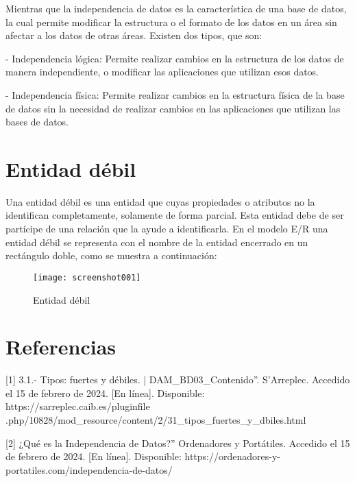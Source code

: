 \documentclass{article}
\begin{document}
	\vspace*{0.5cm}
	
	Mientras que la independencia de datos es la característica de una base de datos, la cual permite modificar la estructura o el formato de los datos en un área sin afectar a los datos de otras áreas. Existen dos tipos, que son:
	
	\vspace*{0.5cm}
	
	- Independencia lógica: Permite realizar cambios en la estructura de los datos de manera independiente, o modificar las aplicaciones que utilizan esos datos.

	- Independencia física: Permite realizar cambios en la estructura física de la base de datos sin la necesidad de realizar cambios en las aplicaciones que utilizan las bases de datos.

	\vspace*{5 cm}

	\section{Entidad débil}
	Una entidad débil es una entidad que cuyas propiedades o atributos no la identifican completamente, solamente de forma parcial. Esta entidad debe de ser partícipe de una relación que la ayude a identificarla.
	En el modelo E/R una entidad débil se representa con el nombre de la entidad encerrado en un rectángulo doble, como se muestra a continuación:

	
\begin{figure}[h]
	\centering
	\texttt{[image: screenshot001]}
	\caption{Entidad débil}
	\label{fig:screenshot001}
\end{figure}

	\section{Referencias}

[1]	3.1.- Tipos: fuertes y débiles. | DAM\_BD03\_Contenido”. S'Arreplec. Accedido el 15 de febrero de 2024. [En línea]. Disponible: https://sarreplec.caib.es/pluginfile
.php/10828/mod\_resource/content/2/31\_tipos\_fuertes\_y\_dbiles.html

\vspace{0.5 cm}

[2]	¿Qué es la Independencia de Datos?” Ordenadores y Portátiles. Accedido el 15 de febrero de 2024. [En línea]. Disponible: https://ordenadores-y-portatiles.com/independencia-de-datos/
	
\end{document}
